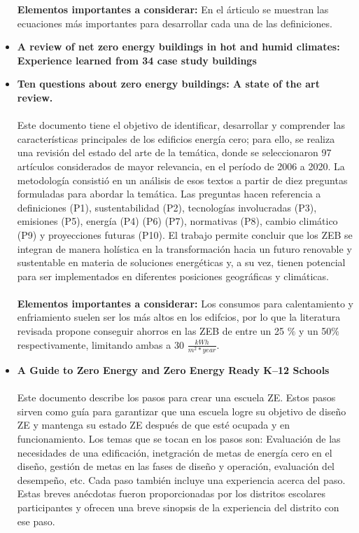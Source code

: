 \documentclass[10pt,twoside]{tesisIER}
\begin{document}
\begin{itemize}
\textbf{Elementos importantes a considerar:} En el árticulo se muestran las ecuaciones más importantes para desarrollar cada una de las definiciones.
\item \textbf{A review of net zero energy buildings in hot and humid climates: Experience learned from 34 case study buildings}
\item \textbf{Ten questions about zero energy buildings: A state of the art review.}
\\\\
Este documento tiene el objetivo de identificar, desarrollar y comprender las características principales de los edificios energía cero; para ello, se realiza una revisión del estado del arte de la temática, donde se seleccionaron 97 artículos considerados de mayor relevancia, en el período de 2006 a 2020. La metodología consistió en un análisis de esos textos a partir de diez preguntas formuladas para abordar la temática. Las preguntas hacen referencia a definiciones (P1), sustentabilidad (P2), tecnologías involucradas (P3), emisiones (P5), energía (P4) (P6) (P7), normativas (P8), cambio climático (P9) y proyecciones futuras (P10). El trabajo permite concluir que los ZEB se integran de manera holística en la transformación hacia un futuro renovable y sustentable en materia de soluciones energéticas y, a su vez, tienen potencial para ser implementados en diferentes posiciones geográficas y climáticas.
\\\\
\textbf{Elementos importantes a considerar:} Los consumos para calentamiento y enfriamiento suelen ser los más altos en los edifcios, por lo que la literatura revisada propone conseguir ahorros en las ZEB de entre un 25 $\%$ y un 50$\%$ respectivamente, limitando ambas a 30 $\frac{kWh}{m^{2}*year}$.
\item \textbf{A Guide to Zero Energy and Zero Energy Ready K–12 Schools}
\\\\
Este documento describe los pasos para crear una escuela ZE. Estos pasos sirven como guía para garantizar que una escuela logre su objetivo de diseño ZE y mantenga su estado ZE después de que esté ocupada y en funcionamiento. Los temas que se tocan en los pasos son: Evaluación de las necesidades de una edificación, inetgración de metas de energía cero en el diseño, gestión de metas en las fases de diseño y operación, evaluación del desempeño, etc. Cada paso también incluye una experiencia acerca del paso. Estas breves anécdotas fueron proporcionadas por los distritos escolares participantes y ofrecen una breve sinopsis de la experiencia del distrito con ese paso.

\end{itemize}
\end{document}

